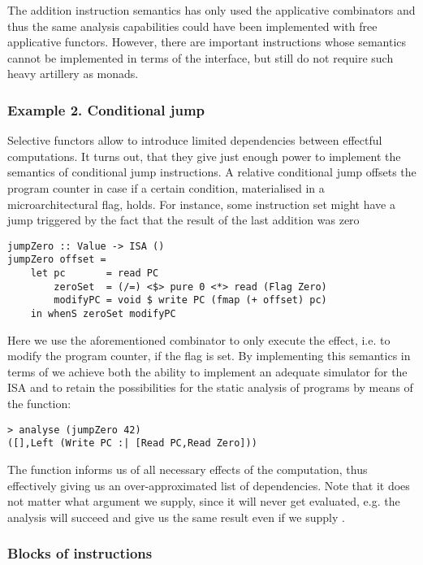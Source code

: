 The addition instruction semantics has only used the applicative combinators and thus
the same analysis capabilities could have been implemented with free applicative functors.
However, there are important instructions whose semantics cannot be implemented in terms
of the  interface, but still do not require such heavy artillery as monads.

\subsubsection{Example 2. Conditional jump}

Selective functors allow to introduce limited dependencies between effectful computations.
It turns out, that they give just enough power to implement the semantics of conditional
jump instructions. A relative conditional jump offsets the program counter in case if a
certain condition, materialised in a microarchitectural flag, holds. For instance, some instruction set might have a jump triggered by the fact that the result of the last addition was zero

\begin{verbatim}
jumpZero :: Value -> ISA ()
jumpZero offset =
    let pc       = read PC
        zeroSet  = (/=) <$> pure 0 <*> read (Flag Zero)
        modifyPC = void $ write PC (fmap (+ offset) pc)
    in whenS zeroSet modifyPC
\end{verbatim}

Here we use the aforementioned  combinator to only execute the effect, i.e.
to modify the program counter, if the flag is set. By implementing this semantics in terms of
 we achieve both the ability to implement an adequate simulator for the ISA and
to retain the possibilities for the static analysis of programs by means of the  function:

\begin{verbatim}
> analyse (jumpZero 42)
([],Left (Write PC :| [Read PC,Read Zero]))
\end{verbatim}

The  function informs us of all necessary effects of the computation, thus
effectively giving us an over-approximated list of dependencies. Note that it does not matter
what argument we supply, since it will never get evaluated, e.g. the analysis will succeed and give us the same result even if we supply .

\subsubsection{Blocks of instructions}

